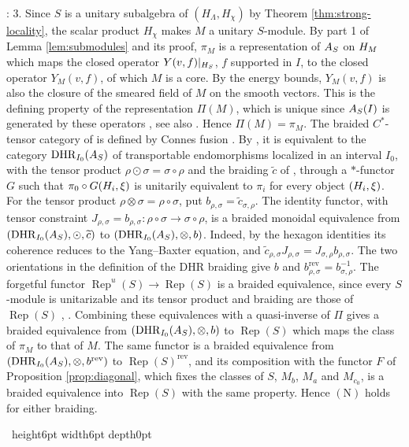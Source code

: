 \documentclass[leqno]{article}
\let\cal\relax
\newcommand{\cal}{\mathcal}
\newcommand{\qed}{\hfill \vrule height6pt  width6pt depth0pt}
\newcommand{\co}{\colon}
\newcommand{\ot}{\otimes}
\DeclareMathOperator{\Rep}{Rep} %
\newenvironment{proof}[1][]{\noindent {\it Proof #1} : }{\hbox{~}\qed
\smallskip
}
\numberwithin{equation}{section}
\begin{document}
\begin{proof}
3. Since $S$ is a unitary subalgebra of $(H_\Lambda,H_\chi)$ by Theorem \ref{thm:strong-locality}, the scalar product $H_\chi$ makes $M$ a unitary $S$-module. By part 1 of Lemma \ref{lem:submodules} and its proof, $\pi_M$ is a representation of $\cal A_S$ on $\cal H_M$ which maps the closed operator $Y(v,f)|_{\cal H_S}$, $f$ supported in $I$, to the closed operator $Y_M(v,f)$, of which $M$ is a core. By the energy bounds, $Y_M(v,f)$ is also the closure of the smeared field of $M$ on the smooth vectors. This is the defining property of the representation $\Pi(M)$, which is unique since $\cal A_S(I)$ is generated by these operators \cite[(3.8) p.~41]{Gui26}, see also \cite[Definition 4.22 p.~43]{Gui25}. Hence $\Pi(M) = \pi_M$. The braided $C^*$-tensor category of \cite{Gui26} is defined by Connes fusion \cite[p.~10]{Gui26}. By \cite[Theorem 6.6 p.~77 and (6.2) p.~74]{Gui21a}, it is equivalent to the category $\mathrm{DHR}_{I_0}(\cal A_S)$ of transportable endomorphisms localized in an interval $I_0$, with the tensor product $\rho \odot \sigma = \sigma \circ \rho$ and the braiding $\widetilde c$ of \cite[(6.1) p.~73]{Gui21a}, through a $*$-functor $G$ such that $\pi_0 \circ G(\cal H_i,\xi)$ is unitarily equivalent to $\pi_i$ for every object $(\cal H_i,\xi)$. For the tensor product $\rho \ot \sigma = \rho \circ \sigma$, put $b_{\rho,\sigma} = \widetilde c_{\sigma,\rho}$. The identity functor, with tensor constraint $J_{\rho,\sigma} = b_{\rho,\sigma} \co \rho \circ \sigma \to \sigma \circ \rho$, is a braided monoidal equivalence from $(\mathrm{DHR}_{I_0}(\cal A_S),\odot,\widetilde c)$ to $(\mathrm{DHR}_{I_0}(\cal A_S),\ot,b)$. Indeed, by the hexagon identities its coherence reduces to the Yang--Baxter equation, and $\widetilde c_{\rho,\sigma}J_{\rho,\sigma} = J_{\sigma,\rho}b_{\rho,\sigma}$. The two orientations in the definition of the DHR braiding give $b$ and $b^{\mathrm{rev}}_{\rho,\sigma} = b_{\sigma,\rho}^{-1}$. The forgetful functor $\Rep^u(S) \to \Rep(S)$ is a braided equivalence, since every $S$-module is unitarizable and its tensor product and braiding are those of $\Rep(S)$ \cite[Theorem 7.9 p.~53]{Gui19}, \cite[Remark 4.3 p.~18]{CGGH23}. Combining these equivalences with a quasi-inverse of $\Pi$ gives a braided equivalence from $(\mathrm{DHR}_{I_0}(\cal A_S),\ot,b)$ to $\Rep(S)$ which maps the class of $\pi_M$ to that of $M$. The same functor is a braided equivalence from $(\mathrm{DHR}_{I_0}(\cal A_S),\ot,b^{\mathrm{rev}})$ to $\Rep(S)^{\mathrm{rev}}$, and its composition with the functor $F$ of Proposition \ref{prop:diagonal}, which fixes the classes of $S$, $M_b$, $M_a$ and $M_{c_0}$, is a braided equivalence into $\Rep(S)$ with the same property. Hence $\mathrm{(N)}$ holds for either braiding.

\end{proof}
\end{document}
